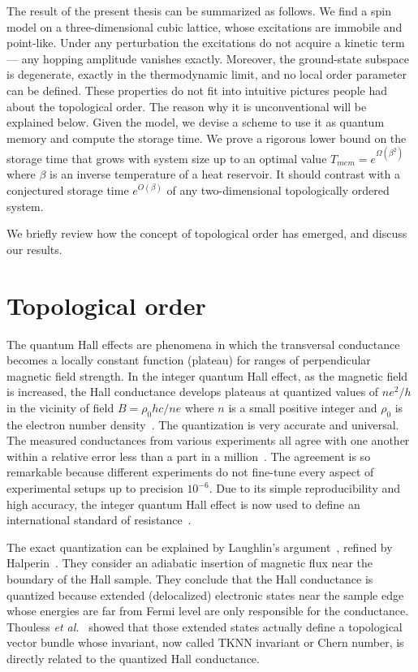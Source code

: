 The result of the present thesis can be summarized as follows. We find a spin model on a three-dimensional cubic lattice, whose excitations are immobile and point-like. Under any perturbation the excitations do not acquire a kinetic term --- any hopping amplitude  vanishes exactly. Moreover, the ground-state subspace is degenerate, exactly in the thermodynamic limit, and no local order parameter can be defined. These properties do not fit into intuitive pictures people had about the topological order. The reason why it is unconventional will be explained below. Given the model, we devise a scheme to use it as quantum memory and compute the storage time. We prove a rigorous lower bound on the storage time that grows with system size up to an optimal value $T_{mem} = e^{\Omega(\beta^2)}$ where $\beta$ is an inverse temperature of a heat reservoir. It should contrast with a conjectured storage time $e^{O(\beta)}$ of any two-dimensional topologically ordered system.


We briefly review how the concept of topological order has emerged, and discuss our results.


\section{Topological order}

The quantum Hall effects are phenomena in which the transversal conductance becomes a locally constant function (plateau) for ranges of perpendicular magnetic field strength. In the integer quantum Hall effect, as the magnetic field is increased, the Hall conductance develops plateaus at quantized values of $n e^2/h$ in the vicinity of field $B = \rho_0 hc/ne$ where $n$ is a small positive integer and $\rho_0$ is the electron number density~\cite{KlitzingDordaPepper1980IQHE}. The quantization is very accurate and universal. The measured conductances from various experiments all agree with one another within a relative error less than a part in a million~\cite{PrangeGirvin1990HallEffect}. The agreement is so remarkable because different experiments do not fine-tune every aspect of experimental setups up to precision $10^{-6}$. Due to its simple reproducibility and high accuracy, the integer quantum Hall effect is now used to define an international standard of resistance~\cite{SI2008}.

The exact quantization can be explained by Laughlin's argument~\cite{Laughlin1981QHE}, refined by Halperin~\cite{Halperin1982QHE}. They consider an adiabatic insertion of magnetic flux near the boundary of the Hall sample. They conclude that the Hall conductance is quantized because extended (delocalized) electronic states near the sample edge whose energies are far from Fermi level are only responsible for the conductance. Thouless {\em et al.}~\cite{TKNN1982} showed that those extended states actually define a topological vector bundle whose invariant, now called TKNN invariant or Chern number, is directly related to the quantized Hall conductance.

